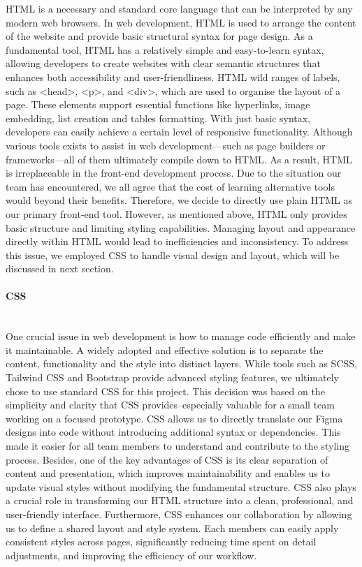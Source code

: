 HTML is a necessary and standard core language that can be interpreted by any modern web browsers. In web development, HTML is used to arrange the content of the website and provide basic structural syntax for page design. As a fundamental tool, HTML has a relatively simple and easy-to-learn syntax, allowing developers to create websites with clear semantic structures that enhances both accessibility and user-friendliness. HTML wild ranges of labels, such as <head>, <p>, and <div>, which are used to organise the layout of a page. These elements support essential functions like hyperlinks, image embedding, list creation and tables formatting. With just basic syntax, developers can easily achieve a certain level of responsive functionality. Although various tools exists to assist in web development—such as page builders or frameworks—all of them ultimately compile down to HTML. As a result, HTML is irreplaceable in the front-end development process. Due to the situation our team has encountered, we all agree that the cost of learning alternative tools would beyond their benefits. Therefore, we decide to directly use plain HTML as our primary front-end tool. However, as mentioned above, HTML only provides basic structure and limiting styling capabilities. Managing layout and appearance directly within HTML would lead to inefficiencies and inconsistency. To address this issue, we employed CSS to handle visual design and layout, which will be discussed in next section. 

\paragraph{CSS}\mbox{}\\

One crucial issue in web development is how to manage code efficiently and make it maintainable. A widely adopted and effective solution is to separate the content, functionality and the style into distinct layers. While tools such as SCSS, Tailwind CSS and Bootstrap provide advanced styling features, we ultimately chose to use standard CSS for this project. This decision was based on the simplicity and clarity that CSS provides--especially valuable for a small team working on a focused prototype. CSS allows us to directly translate our Figma designs into code without introducing additional syntax or dependencies. This made it easier for all team members to understand and contribute to the styling process. Besides, one of the key advantages of CSS is its clear separation of content and presentation, which improves maintainability and enables us to update visual styles without modifying the fundamental structure. CSS also plays a crucial role in transforming our HTML structure into a clean, professional, and user-friendly interface. Furthermore, CSS enhances our collaboration by allowing us to define a shared layout and style system. Each members can easily apply consistent styles across pages, significantly reducing time spent on detail adjustments, and improving the efficiency of our workflow.
